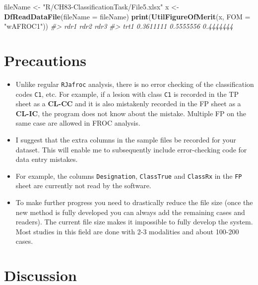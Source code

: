 \documentclass[
]{book}
\newenvironment{Shaded}{\begin{snugshade}}{\end{snugshade}}
\newcommand{\CommentTok}[1]{\textcolor[rgb]{0.56,0.35,0.01}{\textit{#1}}}
\newcommand{\DataTypeTok}[1]{\textcolor[rgb]{0.13,0.29,0.53}{#1}}
\newcommand{\KeywordTok}[1]{\textcolor[rgb]{0.13,0.29,0.53}{\textbf{#1}}}
\newcommand{\NormalTok}[1]{#1}
\newcommand{\StringTok}[1]{\textcolor[rgb]{0.31,0.60,0.02}{#1}}
\providecommand{\tightlist}{%
  \setlength{\itemsep}{0pt}\setlength{\parskip}{0pt}}
\begin{document}
\begin{Shaded}
\begin{Highlighting}[]
\NormalTok{fileName <-}\StringTok{ "R/CH83-ClassificationTask/File5.xlsx"}
\NormalTok{x <-}\StringTok{ }\KeywordTok{DfReadDataFile}\NormalTok{(}\DataTypeTok{fileName =}\NormalTok{ fileName)}
\KeywordTok{print}\NormalTok{(}\KeywordTok{UtilFigureOfMerit}\NormalTok{(x, }\DataTypeTok{FOM =} \StringTok{"wAFROC1"}\NormalTok{))}
\CommentTok{#>           rdr1      rdr2      rdr3}
\CommentTok{#> trt1 0.3611111 0.5555556 0.4444444}
\end{Highlighting}
\end{Shaded}

\hypertarget{classification-tasks-precautions}{%
\section{Precautions}\label{classification-tasks-precautions}}

\begin{itemize}
\tightlist
\item
  Unlike regular \texttt{RJafroc} analysis, there is no error checking of the classification codes \texttt{C1}, etc. For example, if a lesion with class \texttt{C1} is recorded in the TP sheet as a \textbf{CL-CC} and it is also mistakenly recorded in the FP sheet as a \textbf{CL-IC}, the program does not know about the mistake. Multiple FP on the same case are allowed in FROC analysis.
\item
  I suggest that the extra columns in the sample files be recorded for your dataset. This will enable me to subsequently include error-checking code for data entry mistakes.
\item
  For example, the columns \texttt{Designation}, \texttt{ClassTrue} and \texttt{ClassRx} in the \texttt{FP} sheet are currently not read by the software.
\item
  To make further progress you need to drastically reduce the file size (once the new method is fully developed you can always add the remaining cases and readers). The current file size makes it impossible to fully develop the system. Most studies in this field are done with 2-3 modalities and about 100-200 cases.
\end{itemize}

\hypertarget{classification-tasks-discussion}{%
\section{Discussion}\label{classification-tasks-discussion}}
\end{document}
